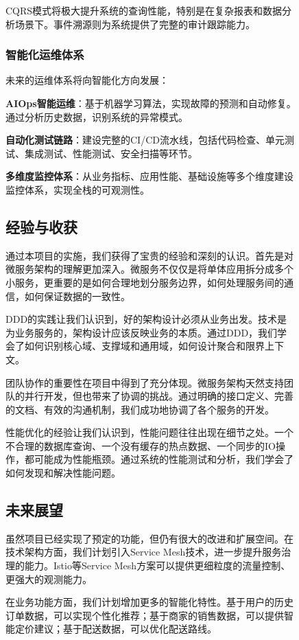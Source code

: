 \documentclass[a4paper,12pt]{article}
\begin{document}
\begin{figure}[H]
CQRS模式将极大提升系统的查询性能，特别是在复杂报表和数据分析场景下。事件溯源则为系统提供了完整的审计跟踪能力。

\subsubsection{智能化运维体系}

未来的运维体系将向智能化方向发展：

\textbf{AIOps智能运维}：基于机器学习算法，实现故障的预测和自动修复。通过分析历史数据，识别系统的异常模式。

\textbf{自动化测试链路}：建设完整的CI/CD流水线，包括代码检查、单元测试、集成测试、性能测试、安全扫描等环节。

\textbf{多维度监控体系}：从业务指标、应用性能、基础设施等多个维度建设监控体系，实现全栈的可观测性。

\subsection{经验与收获}

通过本项目的实施，我们获得了宝贵的经验和深刻的认识。首先是对微服务架构的理解更加深入。微服务不仅仅是将单体应用拆分成多个小服务，更重要的是如何合理地划分服务边界，如何处理服务间的通信，如何保证数据的一致性。

DDD的实践让我们认识到，好的架构设计必须从业务出发。技术是为业务服务的，架构设计应该反映业务的本质。通过DDD，我们学会了如何识别核心域、支撑域和通用域，如何设计聚合和限界上下文。

团队协作的重要性在项目中得到了充分体现。微服务架构天然支持团队的并行开发，但也带来了协调的挑战。通过明确的接口定义、完善的文档、有效的沟通机制，我们成功地协调了各个服务的开发。

性能优化的经验让我们认识到，性能问题往往出现在细节之处。一个不合理的数据库查询、一个没有缓存的热点数据、一个同步的IO操作，都可能成为性能瓶颈。通过系统的性能测试和分析，我们学会了如何发现和解决性能问题。

\subsection{未来展望}

虽然项目已经实现了预定的功能，但仍有很大的改进和扩展空间。在技术架构方面，我们计划引入Service Mesh技术，进一步提升服务治理的能力。Istio等Service Mesh方案可以提供更细粒度的流量控制、更强大的观测能力。

在业务功能方面，我们计划增加更多的智能化特性。基于用户的历史订单数据，可以实现个性化推荐；基于商家的销售数据，可以提供智能定价建议；基于配送数据，可以优化配送路线。


\end{figure}
\end{document}
